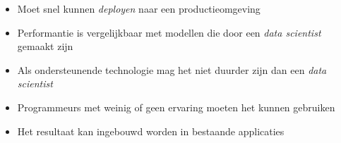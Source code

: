 \begin{itemize}
    \item Moet snel kunnen \textit{deployen} naar een productieomgeving
    \item Performantie is vergelijkbaar met modellen die door een \textit{data scientist} gemaakt zijn
    \item Als ondersteunende technologie mag het niet duurder zijn dan een \textit{data scientist}
    \item Programmeurs met weinig of geen ervaring moeten het kunnen gebruiken
    \item Het resultaat kan ingebouwd worden in bestaande applicaties
\end{itemize}
